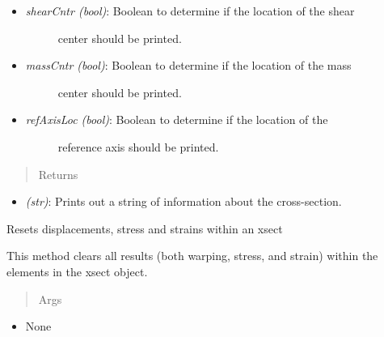 \documentclass[letterpaper,10pt,english]{sphinxmanual}
\begin{document}
\begin{fulllineitems}
\begin{fulllineitems}
\begin{itemize}
\begin{description}
\end{description}

\item {} \begin{description}
\item[{\emph{shearCntr (bool)}: Boolean to determine if the location of the shear}] \leavevmode
center should be printed.

\end{description}

\item {} \begin{description}
\item[{\emph{massCntr (bool)}: Boolean to determine if the location of the mass}] \leavevmode
center should be printed.

\end{description}

\item {} \begin{description}
\item[{\emph{refAxisLoc (bool)}: Boolean to determine if the location of the}] \leavevmode
reference axis should be printed.

\end{description}

\end{itemize}
\begin{quote}\begin{description}
\item[{Returns}] \leavevmode
\end{description}\end{quote}
\begin{itemize}
\item {} 
\emph{(str)}: Prints out a string of information about the cross-section.

\end{itemize}

\end{fulllineitems}


\begin{fulllineitems}
\label{structures:AeroComBAT.Structures.XSect.resetResults}
Resets displacements, stress and strains within an xsect

This method clears all results (both warping, stress, and strain)
within the elements in the xsect object.
\begin{quote}\begin{description}
\item[{Args}] \leavevmode
\end{description}\end{quote}
\begin{itemize}
\item {} 
None


\end{itemize}
\end{fulllineitems}
\end{fulllineitems}
\end{document}
